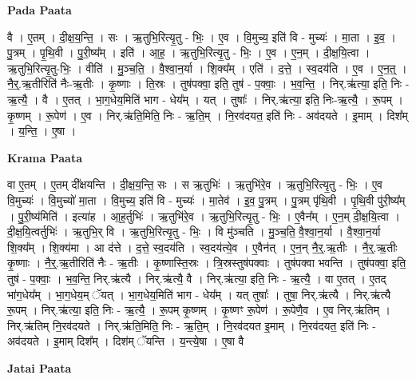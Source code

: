 \documentclass[17pt]{extarticle}
\begin{document}
\textbf{Pada Paata} \newline

वै । ए॒तम् । दी॒क्ष॒य॒न्ति॒ । सः । ऋ॒तुभि॒रित्यृ॒तु - भिः॒ । ए॒व । वि॒मुच्य॒ इति॑ वि - मुच्यः॑ । मा॒ता । इ॒व॒ । पु॒त्रम् । पृ॒थि॒वी । पु॒री॒ष्य᳚म् । इति॑ । आ॒ह॒ । ऋ॒तुभि॒रित्यृ॒तु - भिः॒ । ए॒व । ए॒न॒म् । दी॒क्ष॒यि॒त्वा । ऋ॒तुभि॒रित्यृ॒तु-भिः॒ । वीति॑ । मु॒ञ्च॒ति॒ । वै॒श्वा॒न॒र्या । शि॒क्य᳚म् । एति॑ । द॒त्ते॒ । स्व॒दय॑ति । ए॒व । ए॒न॒त्॒ । नै॒र्॒.ऋ॒तीरिति॑ नैः-ऋ॒तीः । कृ॒ष्णाः । ति॒स्रः । तुष॑पक्वा॒ इति॒ तुष॑ - प॒क्वाः॒ । भ॒व॒न्ति॒ । निर्.ऋ॑त्या॒ इति॒ निः - ऋ॒त्यै॒ । वै । ए॒तत् । भा॒ग॒धेय॒मिति॑ भाग - धेय᳚म् । यत् । तुषाः᳚ । निर्.ऋ॑त्या॒ इति॒ निः-ऋ॒त्यै॒ । रू॒पम् । कृ॒ष्णम् । रू॒पेण॑ । ए॒व । निर्.ऋ॑ति॒मिति॒ निः - ऋ॒ति॒म् । नि॒रव॑दयत॒ इति॑ निः - अव॑दयते । इ॒माम् । दिश᳚म् । य॒न्ति॒ । ए॒षा ।  \newline


\textbf{Krama Paata} \newline

वा ए॒तम् । ए॒तम् दी᳚क्षयन्ति । दी॒क्ष॒य॒न्ति॒ सः । स ऋ॒तुभिः॑ । ऋ॒तुभि॑रे॒व । ऋ॒तुभि॒रित्यृ॒तु - भिः॒ । ए॒व वि॒मुच्यः॑ । वि॒मुच्यो॑ मा॒ता । वि॒मुच्य॒ इति॑ वि - मुच्यः॑ । मा॒तेव॑ । इ॒व॒ पु॒त्रम् । पु॒त्रम् पृ॑थि॒वी । पृ॒थि॒वी पु॑री॒ष्य᳚म् । पु॒री॒ष्य॑मिति॑ । इत्या॑ह । आ॒ह॒र्तुभिः॑ । ऋ॒तुभि॑रे॒व । ऋ॒तुभि॒रित्यृ॒तु - भिः॒ । ए॒वैन᳚म् । ए॒न॒म् दी॒क्ष॒यि॒त्वा । दी॒क्ष॒यि॒त्वर्तुभिः॑ । ऋ॒तुभि॒र् वि । ऋ॒तुभि॒रित्यृ॒तु - भिः॒ । वि मु॑ञ्चति । मु॒ञ्च॒ति॒ वै॒श्वा॒न॒र्या । वै॒श्वा॒न॒र्या शि॒क्य᳚म् । शि॒क्य॑मा । आ द॑त्ते । द॒त्ते॒ स्व॒दय॑ति । स्व॒दय॑त्ये॒व । ए॒वैन॑त् । ए॒न॒न् नै॒र्॒.ऋ॒तीः । नै॒र्॒.ऋ॒तीः कृ॒ष्णाः । नै॒र्॒.ऋ॒तीरिति॑ नैः - ऋ॒तीः । कृ॒ष्णास्ति॒स्रः । त्रि॒स्रस्तुष॑पक्वाः । तुष॑पक्वा भवन्ति । तुष॑पक्वा॒ इति॒ तुष॑ - प॒क्वाः॒ । भ॒व॒न्ति॒ निर्.ऋ॑त्यै । निर्.ऋ॑त्यै॒ वै । निर्.ऋ॑त्या॒ इति॒ निः - ऋ॒त्यै॒ । वा ए॒तत् । ए॒तद् भा॑ग॒धेय᳚म् । भा॒ग॒धेय॒म् ॅयत् । भा॒ग॒धेय॒मिति॑ भाग - धेय᳚म् । यत् तुषाः᳚ । तुषा॒ निर्.ऋ॑त्यै । निर्.ऋ॑त्यै रू॒पम् । निर्.ऋ॑त्या॒ इति॒ निः - ऋ॒त्यै॒ । रू॒पम् कृ॒ष्णम् । कृ॒ष्णꣳ रू॒पेण॑ । रू॒पेणै॒व । ए॒व निर्.ऋ॑तिम् । निर्.ऋ॑तिम् नि॒रव॑दयते । निर्.ऋ॑ति॒मिति॒ निः - ऋ॒ति॒म् । नि॒रव॑दयत इ॒माम् । नि॒रव॑दयत॒ इति॑ निः - अव॑दयते । इ॒माम् दिश᳚म् । दिश॑म् ॅयन्ति । य॒न्त्ये॒षा । ए॒षा वै \newline

\textbf{Jatai Paata} \newline
\end{document}
